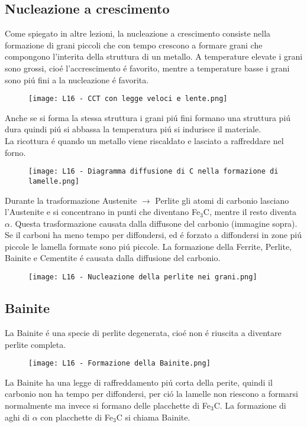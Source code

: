 \documentclass{article}
\begin{document}
{        \subsection{Nucleazione a crescimento}
            Come spiegato in altre lezioni, la nucleazione a crescimento consiste nella formazione di grani piccoli che con tempo crescono a formare grani che compongono l'interita della struttura di un metallo. A temperature elevate i grani sono grossi, cio\'e l'accrescimento \'e favorito, mentre a temperature basse i grani sono pi\'u fini a la nucleazione \'e favorita.\\
            \begin{figure}[h!]
                \centering
                \texttt{[image: L16 - CCT con legge veloci e lente.png]}
            \end{figure}
            Anche se si forma la stessa struttura i grani pi\'u fini formano una struttura pi\'u dura quindi pi\'u si abbassa la temperatura pi\'u si indurisce il materiale.\\
            La ricottura \'e quando un metallo viene riscaldato e lasciato a raffreddare nel forno.\\
            \begin{figure}[h!]
                \centering
                \texttt{[image: L16 - Diagramma diffusione di C nella formazione di lamelle.png]}
            \end{figure}
            Durante la trasformazione Austenite $\rightarrow$ Perlite gli atomi di carbonio lasciano l'Austenite e si concentrano in punti che diventano Fe$_3$C, mentre il resto diventa $\alpha$. Questa trasformazione causata dalla diffusone del carbonio (immagine sopra). Se il carboni ha meno tempo per diffondersi, ed \'e forzato a diffondersi in zone pi\'u piccole  le lamella formate sono pi\'u piccole. La formazione della Ferrite, Perlite, Bainite e Cementite \'e causata dalla diffusione del carbonio.\\
            \begin{figure}[h!]
                \centering
                \texttt{[image: L16 - Nucleazione della perlite nei grani.png]}
            \end{figure}
        \subsection{Bainite}
            La Bainite \'e una specie di perlite degenerata, cio\'e non \'e riuscita a diventare perlite completa.\\
            \begin{figure}[h!]
                \centering
                \texttt{[image: L16 - Formazione della Bainite.png]}
            \end{figure}
            La Bainite ha una legge di raffreddamento pi\'u corta della perite, quindi il carbonio non ha tempo per diffondersi, per ci\'o la lamelle non riescono a formarsi normalmente ma invece si formano delle placchette di Fe$_3$C. La formazione di aghi di $\alpha$ con placchette di Fe$_3$C si chiama Bainite. 
}
\end{document}
